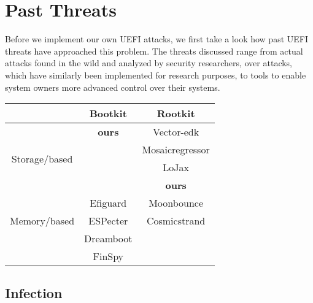 
\chapter{Past Threats}


Before we implement our own \ac{UEFI} attacks, we first take a look how past \ac{UEFI} threats have approached this problem.
The threats discussed range from actual attacks found in the wild and analyzed by security researchers, over attacks, which have similarly been implemented for research purposes, to tools to enable system owners more advanced control over their systems.

\begin{center}
    \begin{tabular}{c|c|c}
                                           & Bootkit       & Rootkit         \\
        \hline
        \multirow{4}{4em}{Storage\-/based} & \textbf{ours} & Vector-edk      \\
                                           &               & Mosaicregressor \\
                                           &               & LoJax           \\
                                           &               & \textbf{ours}   \\
        \hline
        \multirow{3}{4em}{Memory\-/based}  & Efiguard      & Moonbounce      \\
                                           & ESPecter      & Cosmicstrand    \\
                                           & Dreamboot     &                 \\
                                           & FinSpy        &                 \\
    \end{tabular}
\end{center}

\section{Infection}

